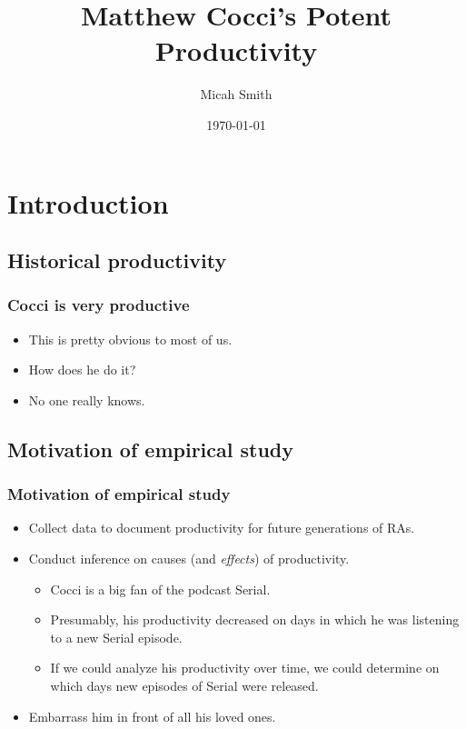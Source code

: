 \documentclass{beamer}
\title{Matthew Cocci's Potent Productivity}
\author{Micah Smith}
\date{\today}
\begin{document}
\frame{\titlepage}

\section[Outline]{}
\frame{\tableofcontents}

\section{Introduction}
\subsection{Historical productivity}
\frame
{
  \frametitle{Cocci is very productive}

  \begin{itemize}
  \item<1-> This is pretty obvious to most of us.
  \item<2-> How does he do it?
  \item<3-> No one really knows.
  \end{itemize}
}

\subsection{Motivation of empirical study}
\frame
{
  \frametitle{Motivation of empirical study}

  \begin{itemize}
  \item<1-> Collect data to document productivity for future generations of RAs.
  \item<2-> Conduct inference on causes (and \textit{effects}) of productivity.
    \begin{itemize}
    \item<3-> Cocci is a big fan of the podcast Serial.
    \item<4-> Presumably, his productivity decreased on days in which he was listening to a new Serial episode.
    \item<5-> If we could analyze his productivity over time, we could determine on which days new episodes of Serial were released.
    \end{itemize}
  \item<6-> Embarrass him in front of all his loved ones.

  \end{itemize}
}
\end{document}
